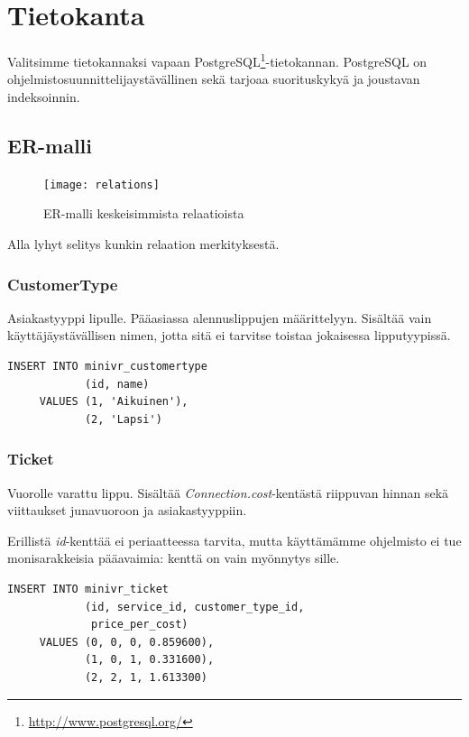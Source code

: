 \documentclass[a4paper,twoside,titlepage,12pt]{article}
\begin{document}
\lstset{language=SQL}

\section{Tietokanta}

Valitsimme tietokannaksi vapaan PostgreSQL\footnote{\url{http://www.postgresql.org/}}-tietokannan. PostgreSQL on ohjelmistosuunnittelijaystävällinen sekä tarjoaa suorituskykyä ja joustavan indeksoinnin.

\subsection{ER-malli}

\begin{figure}
  \texttt{[image: relations]}
  \caption{ER-malli keskeisimmista relaatioista}
\end{figure}

Alla lyhyt selitys kunkin relaation merkityksestä.

\subsubsection{CustomerType}

Asiakastyyppi lipulle. Pääasiassa alennuslippujen määrittelyyn. Sisältää vain
käyttäjäystävällisen nimen, jotta sitä ei tarvitse toistaa jokaisessa
lipputyypissä.

\begin{lstlisting}
INSERT INTO minivr_customertype
            (id, name)
     VALUES (1, 'Aikuinen'),
            (2, 'Lapsi')
\end{lstlisting}

\subsubsection{Ticket}

Vuorolle varattu lippu. Sisältää \emph{Connection.cost}-kentästä riippuvan
hinnan sekä viittaukset junavuoroon ja asiakastyyppiin.

Erillistä \emph{id}-kenttää ei periaatteessa tarvita, mutta käyttämämme
ohjelmisto ei tue monisarakkeisia pääavaimia: kenttä on vain myönnytys sille.

\begin{lstlisting}
INSERT INTO minivr_ticket
            (id, service_id, customer_type_id,
             price_per_cost)
     VALUES (0, 0, 0, 0.859600),
            (1, 0, 1, 0.331600),
            (2, 2, 1, 1.613300)
\end{lstlisting}
\end{document}
